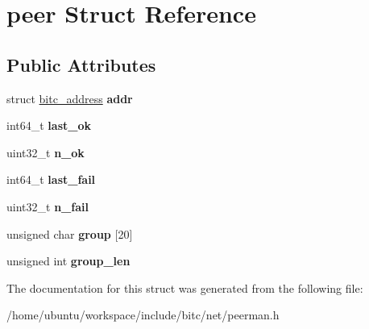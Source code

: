 \hypertarget{structpeer}{\section{peer Struct Reference}
\label{structpeer}
}
\subsection*{Public Attributes}
\begin{DoxyCompactItemize}
\item 
\hypertarget{structpeer_ac977a6ea1f2fc655508b845e9c7dc303}{struct \hyperlink{structbitc__address}{bitc\-\_\-address} {\bfseries addr}}\label{structpeer_ac977a6ea1f2fc655508b845e9c7dc303}

\item 
\hypertarget{structpeer_ad11e0a077b509e6e2681a8f7cb088a31}{int64\-\_\-t {\bfseries last\-\_\-ok}}\label{structpeer_ad11e0a077b509e6e2681a8f7cb088a31}

\item 
\hypertarget{structpeer_a22a6421bb65bd59948a76e960f7ad2fb}{uint32\-\_\-t {\bfseries n\-\_\-ok}}\label{structpeer_a22a6421bb65bd59948a76e960f7ad2fb}

\item 
\hypertarget{structpeer_aeae397fd5620c86fc76455fc0b936bc6}{int64\-\_\-t {\bfseries last\-\_\-fail}}\label{structpeer_aeae397fd5620c86fc76455fc0b936bc6}

\item 
\hypertarget{structpeer_aa12d794dac2147efb0e3bfd0d4c6cea9}{uint32\-\_\-t {\bfseries n\-\_\-fail}}\label{structpeer_aa12d794dac2147efb0e3bfd0d4c6cea9}

\item 
\hypertarget{structpeer_a361e01195f6a090b02a3d863ff5a6dc0}{unsigned char {\bfseries group} \mbox{[}20\mbox{]}}\label{structpeer_a361e01195f6a090b02a3d863ff5a6dc0}

\item 
\hypertarget{structpeer_aaeec3fbd808ae625f906536ae2236d9a}{unsigned int {\bfseries group\-\_\-len}}\label{structpeer_aaeec3fbd808ae625f906536ae2236d9a}

\end{DoxyCompactItemize}


The documentation for this struct was generated from the following file\-:\begin{DoxyCompactItemize}
\item 
/home/ubuntu/workspace/include/bitc/net/peerman.\-h\end{DoxyCompactItemize}
